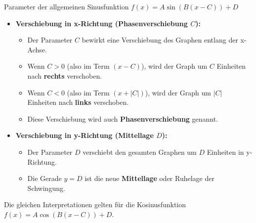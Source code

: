 \begin{merksatzumgebung}{Parameter der allgemeinen Sinusfunktion $f(x) = A \sin(B(x-C)) + D$}
\begin{itemize}
\begin{itemize}
        \end{itemize}
    \item \textbf{Verschiebung in x-Richtung (Phasenverschiebung $C$):}
        \begin{itemize}
            \item Der Parameter $C$ bewirkt eine Verschiebung des Graphen entlang der x-Achse.
            \item Wenn $C>0$ (also im Term $(x-C)$), wird der Graph um $C$ Einheiten nach \textbf{rechts} verschoben.
            \item Wenn $C<0$ (also im Term $(x+ |C|)$), wird der Graph um $|C|$ Einheiten nach \textbf{links} verschoben.
            \item Diese Verschiebung wird auch \textbf{Phasenverschiebung} genannt.
        \end{itemize}
    \item \textbf{Verschiebung in y-Richtung (Mittellage $D$):}
        \begin{itemize}
            \item Der Parameter $D$ verschiebt den gesamten Graphen um $D$ Einheiten in y-Richtung.
            \item Die Gerade $y=D$ ist die neue \textbf{Mittellage} oder Ruhelage der Schwingung.
        \end{itemize}
\end{itemize}
Die gleichen Interpretationen gelten für die Kosinusfunktion $f(x) = A \cos(B(x-C)) + D$.
\end{merksatzumgebung}

